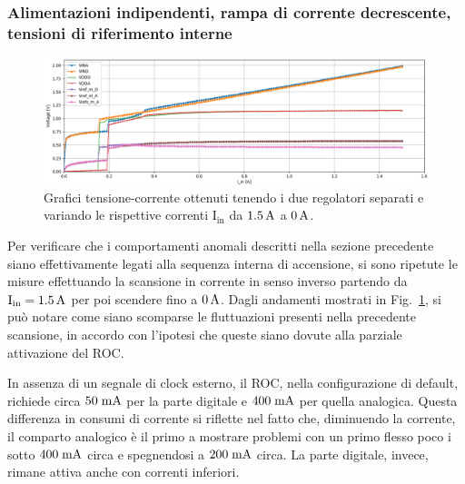 

\subsubsection{Alimentazioni indipendenti, rampa di corrente decrescente, tensioni di riferimento interne}

\begin{figure}
\centering
\includegraphics[width=\textwidth]{Immagini/IDI2}
\caption{Grafici tensione-corrente ottenuti tenendo i due regolatori separati e variando le rispettive correnti $\mathrm{I_{in}}$ da $1.5\rm \, A$ a $0\rm \, A$.}
\label{IDI}
\end{figure}

Per verificare che i comportamenti anomali descritti nella sezione precedente siano effettivamente legati alla sequenza interna di accensione, si sono ripetute le misure effettuando la scansione in corrente in senso inverso partendo da $\mathrm{I_{in}}=1.5\rm \, A$ per poi scendere fino a $0\rm \, A$. Dagli andamenti mostrati in Fig.~\ref{IDI}, si può notare come siano scomparse le fluttuazioni presenti nella precedente scansione, in accordo con l'ipotesi che queste siano dovute alla parziale attivazione del ROC. %

In assenza di un segnale di clock esterno, il ROC, nella configurazione di default, richiede circa $50\rm \; mA$ per la parte digitale e $400\rm \; mA$ per quella analogica.
Questa differenza in consumi di corrente si riflette nel fatto che, diminuendo la corrente, il comparto analogico \`e il primo a mostrare problemi con un primo flesso poco i sotto $400\rm \; mA$ circa e spegnendosi a $200\rm \; mA$ circa. La parte digitale, invece, rimane attiva anche con correnti inferiori.

